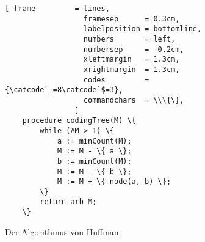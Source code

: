\begin{figure}[!ht]
\centering
\begin{Verbatim}[ frame         = lines, 
                  framesep      = 0.3cm, 
                  labelposition = bottomline,
                  numbers       = left,
                  numbersep     = -0.2cm,
                  xleftmargin   = 1.3cm,
                  xrightmargin  = 1.3cm,
                  codes         = {\catcode`_=8\catcode`$=3},
                  commandchars  = \\\{\},
                ]
    procedure codingTree(M) \{
        while (#M > 1) \{
            a := minCount(M);
            M := M - \{ a \};
            b := minCount(M);
            M := M - \{ b \};
            M := M + \{ node(a, b) \};
        \}
        return arb M;
    \}
\end{Verbatim}
\vspace*{-0.3cm}
\caption{Der Algorithmus von Huffman.}
\label{fig:huffman}
\end{figure} %

